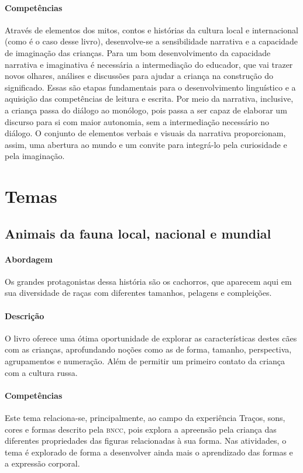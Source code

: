 \documentclass[11pt]{extarticle}
\begin{document}
\paragraph{Competências} 
Através de elementos dos mitos, contos e histórias da cultura local e internacional (como é o caso desse livro), desenvolve-se a sensibilidade narrativa e a capacidade de imaginação das crianças. Para um bom desenvolvimento da capacidade narrativa e imaginativa é necessária a intermediação do educador, que vai trazer novos olhares, análises e discussões para ajudar a criança na construção do significado. Essas são etapas fundamentais para o desenvolvimento linguístico e a aquisição das competências de leitura e escrita. Por meio da narrativa, inclusive, a criança passa do diálogo ao monólogo, pois passa a ser capaz de elaborar um discurso para si com maior autonomia, sem a intermediação necessário no diálogo.
O conjunto de elementos verbais e visuais da narrativa proporcionam, assim,
uma abertura ao mundo e um convite para integrá-lo pela curiosidade e pela imaginação.


\section{Temas}

\subsection{Animais da fauna local, nacional e mundial}

\paragraph{Abordagem} Os grandes protagonistas dessa história são os cachorros, que aparecem aqui em sua diversidade de raças com diferentes tamanhos, pelagens e compleições.

\paragraph{Descrição} O livro oferece uma ótima oportunidade de explorar 
as características destes cães com as crianças, aprofundando noções como as de forma, tamanho, perspectiva, agrupamentos e numeração. Além de permitir um primeiro contato da criança com a cultura russa.

\paragraph{Competências} Este tema relaciona-se, principalmente, ao 
campo da experiência Traços, sons, cores e formas
descrito pela \textsc{bncc}, pois explora a apreensão pela criança das diferentes propriedades das figuras relacionadas à sua forma. Nas atividades, o tema é explorado de forma a desenvolver ainda mais o aprendizado das formas e a expressão corporal.
\end{document}
